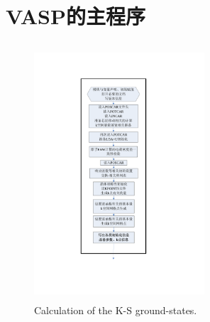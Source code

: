 \documentclass[cjk,slidestop,compress,mathserif,blue]{beamer}
\begin{document}


\appendix
\section{VASP的主程序}
\frame
{
\frametitle{}
\begin{figure}[h!]
\centering
\vspace*{-0.80in}
\includegraphics[height=3.72in,width=2.5in,viewport=160 118 395 755,clip]{Figures/VASP_main_Flow-1.pdf}
\caption{\small \textrm{Calculation of the K-S ground-states.}}%
\label{VASP_Follow-1}
\end{figure}
}
\end{document}
